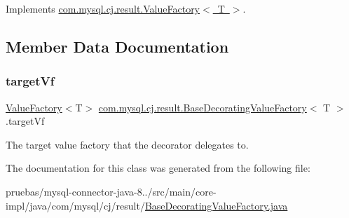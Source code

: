 Implements \mbox{\hyperlink{interfacecom_1_1mysql_1_1cj_1_1result_1_1_value_factory_a54de50a710778bcff410434107d34036}{com.\+mysql.\+cj.\+result.\+Value\+Factory$<$ T $>$}}.



\subsection{Member Data Documentation}
\mbox{\label{classcom_1_1mysql_1_1cj_1_1result_1_1_base_decorating_value_factory_a64c2c62bd9906ec3af7fc62e58bf34b3}} 
\subsubsection{\texorpdfstring{target\+Vf}{targetVf}}
{\footnotesize\ttfamily \mbox{\hyperlink{interfacecom_1_1mysql_1_1cj_1_1result_1_1_value_factory}{Value\+Factory}}$<$T$>$ \mbox{\hyperlink{classcom_1_1mysql_1_1cj_1_1result_1_1_base_decorating_value_factory}{com.\+mysql.\+cj.\+result.\+Base\+Decorating\+Value\+Factory}}$<$ T $>$.target\+Vf\hspace{0.3cm}{\ttfamily [protected]}}

The target value factory that the decorator delegates to. 

The documentation for this class was generated from the following file\+:\begin{DoxyCompactItemize}
\item 
pruebas/mysql-\/connector-\/java-\/8../src/main/core-\/impl/java/com/mysql/cj/result/\mbox{\hyperlink{_base_decorating_value_factory_8java}{Base\+Decorating\+Value\+Factory.\+java}}\end{DoxyCompactItemize}
